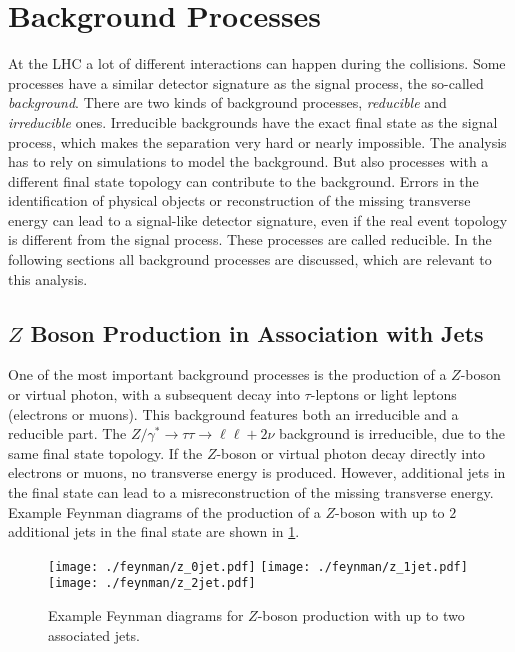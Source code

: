 \section{Background Processes}\label{sec:processes:background}

At the LHC a lot of different interactions can happen during the collisions.
Some processes have a similar detector signature as the signal process, the so-called \emph{background}.
There are two kinds of background processes, \emph{reducible} and \emph{irreducible} ones.
Irreducible backgrounds have the exact final state as the signal process, which makes the separation very hard or nearly impossible.
The analysis has to rely on simulations to model the background.
But also processes with a different final state topology can contribute to the background.
Errors in the identification of physical objects or reconstruction of the missing transverse energy can lead
to a signal-like detector signature, even if the real event topology is different from the signal process.
These processes are called reducible.
In the following sections all background processes are discussed, which are relevant to this analysis.

\subsection{$Z$ Boson Production in Association with Jets}\label{sub:processes:z}

One of the most important background processes is the production of a $Z$-boson or
virtual photon, with a subsequent decay into $\tau$-leptons or light leptons (electrons or muons).
This background features both an irreducible and a reducible part.
The $Z / \gamma^* \to \tau\tau \to \ell\ell + 2 \nu$ background is irreducible, due to the same final state topology.
If the $Z$-boson or virtual photon decay directly into electrons or muons, no transverse energy is produced.
However, additional jets in the final state can lead to a misreconstruction of the missing transverse energy.
Example Feynman diagrams of the production of a $Z$-boson with up to $2$ additional jets in the final state are
shown in \cref{fig:processes:z}.

\begin{figure}[htb]
    \centering
    \texttt{[image: ./feynman/z\_0jet.pdf]}
    \texttt{[image: ./feynman/z\_1jet.pdf]}
    \texttt{[image: ./feynman/z\_2jet.pdf]}
    \caption{Example Feynman diagrams for $Z$-boson production with up to two associated jets.}\label{fig:processes:z}
\end{figure}

